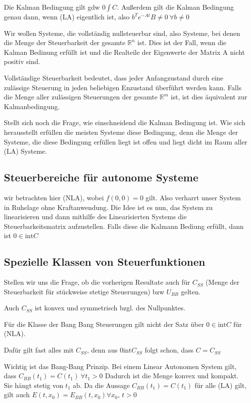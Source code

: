 \documentclass[pdftex,a4paper,oneside]{scrbook}
\begin{document}
	Die Kalman Bedingung gilt gdw $0 \int C$. Außerdem gilt die Kalman Bedingung genau dann, wenn (LA) eigentlich ist, also $b^T e^{-At} B \neq 0 \: \forall b \neq 0 $
	
	Wir wollen Systeme, die vollständig nullsteuerbar sind, also Systeme, bei denen die Menge der Steuerbarkeit der gesamte $\mathbb{R}^n$ ist. Dies ist der Fall, wenn die Kalman Bedinung erfüllt ist und die Realteile der Eigenwerte der Matrix A nicht positiv sind. 
	
	Vollständige Steuerbarkeit bedeutet, dass jeder Anfangzustand durch eine zulässige Steuerung in jeden beliebigen Enzustand überführt werden kann. Falls die Menge aller zulässigen Steuerungen der gesamte $\mathbb{R}^m$ ist, ist dies äquivalent zur Kalmanbedingung. 
	
	Stellt sich noch die Frage, wie einschneidend die Kalman Bedingung ist. Wie sich herausstellt erfüllen die meisten Systeme diese Bedingung, denn die Menge der Systeme, die diese Bedingung erfüllen liegt ist offen und liegt dicht im Raum aller (LA) Systeme. 
	
	\subsection{Steuerbereiche für autonome Systeme}
	wir betrachten hier (NLA), wobei $f(0,0)=0$ gilt. Also verharrt unser System in Ruhelage ohne Kraftanwendung. 
	Die Idee ist es nun, das System zu linearisieren und dann mithilfe des Linearisierten Systems die Steuerbarkeitsmatrix aufzustellen. Falls diese die Kalmann Bediung erfüllt, dann ist $0 \in \text{int}C$
	
	\subsection{Spezielle Klassen von Steuerfunktionen}
	
	Stellen wir uns die Frage, ob die vorherigen Resultate auch für $C_{SS}$ (Menge der Steuerbarkeit für stückweise stetige Steuerungen) bzw $U_{BB}$ gelten.
	
	Auch $C_{SS}$ ist konvex und symmetrisch bzgl. des Nullpunktes. 
	
	Für die Klasse der Bang Bang Steuerungen gilt nicht der Satz über $0 \in \text{int} C $ für (NLA).
	
	Dafür gilt fast alles mit $C_{SS}$, denn aus $0 \text{int} C_{SS}$ folgt schon, dass $C = C_{SS}$
	
	Wichtig ist das Bang-Bang Prinzip. Bei einem Linear Autonomen System gilt, dass $C_{BB}(t_1) = C(t_1) \: \forall t_1>0$ Dadurch ist die Menge konvex und kompakt. Sie hängt stetig von $t_1$ ab. Da die Aussage $C_{BB}(t_1) = C(t_1) $ für alle (LA) gilt, gilt auch $E(t,x_0) = E_{BB}(t,x_0)  \forall x_0, \, t>0$ 
	
\end{document}
